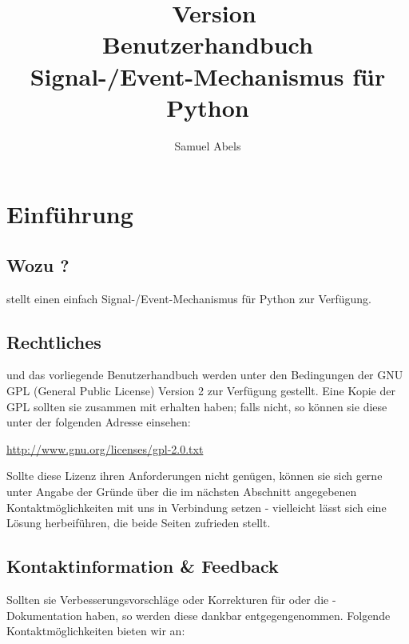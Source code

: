 \usepackage{german}   %
\title{\productname\ Version \productversion\\
Benutzerhandbuch\\
\vspace{5 mm}
\large Signal-/Event-Mechanismus für Python}
\author{Samuel Abels}


\maketitle
\tableofcontents

\newpage
\section{Einführung}
\subsection{Wozu \productname?}

\product stellt einen einfach Signal-/Event-Mechanismus für Python zur 
Verfügung.

\subsection{Rechtliches}

\product und das vorliegende Benutzerhandbuch werden unter den Bedingungen 
der GNU GPL (General Public License) Version 2 zur Verfügung gestellt. Eine 
Kopie der GPL sollten sie zusammen mit \product erhalten haben; falls nicht, 
so können sie diese unter der folgenden Adresse einsehen:

\vspace{1em}
\url{http://www.gnu.org/licenses/gpl-2.0.txt}
\vspace{1em}

Sollte diese Lizenz ihren Anforderungen nicht genügen, können sie sich 
gerne unter Angabe der Gründe über die im nächsten Abschnitt 
angegebenen Kontaktmöglichkeiten mit uns in Verbindung setzen - vielleicht 
lässt sich eine Lösung herbeiführen, die beide Seiten zufrieden stellt.


\subsection{Kontaktinformation \& Feedback}

Sollten sie Verbesserungsvorschläge oder Korrekturen für \product oder 
die \product-Dokumentation haben, so werden diese dankbar entgegengenommen.
Folgende Kontaktmöglichkeiten bieten wir an: \\

